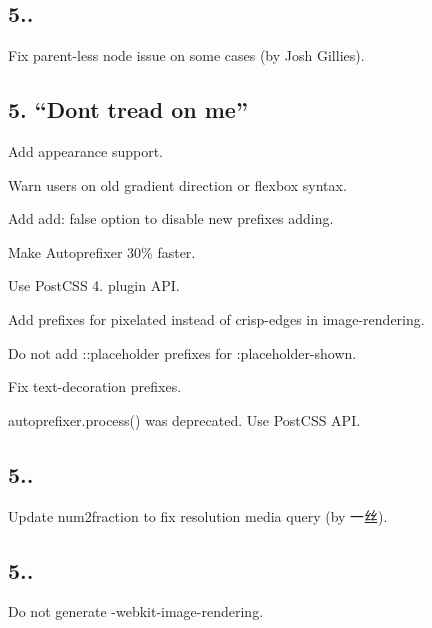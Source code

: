 \subsection*{5..}


\begin{DoxyItemize}
\item Fix parent-\/less node issue on some cases (by Josh Gillies).
\end{DoxyItemize}

\subsection*{5. “\+Dont tread on me”}


\begin{DoxyItemize}
\item Add {\ttfamily appearance} support.
\item Warn users on old gradient direction or flexbox syntax.
\item Add {\ttfamily add\+: false} option to disable new prefixes adding.
\item Make Autoprefixer 30\% faster.
\item Use Post\+C\+SS 4. plugin A\+PI.
\item Add prefixes for {\ttfamily pixelated} instead of {\ttfamily crisp-\/edges} in {\ttfamily image-\/rendering}.
\item Do not add {\ttfamily \+::placeholder} prefixes for {\ttfamily \+:placeholder-\/shown}.
\item Fix {\ttfamily text-\/decoration} prefixes.
\item {\ttfamily autoprefixer.\+process()} was deprecated. Use Post\+C\+SS A\+PI.
\end{DoxyItemize}

\subsection*{5..}


\begin{DoxyItemize}
\item Update {\ttfamily num2fraction} to fix resolution media query (by 一丝).
\end{DoxyItemize}

\subsection*{5..}


\begin{DoxyItemize}
\item Do not generate {\ttfamily -\/webkit-\/image-\/rendering}.
\end{DoxyItemize}

